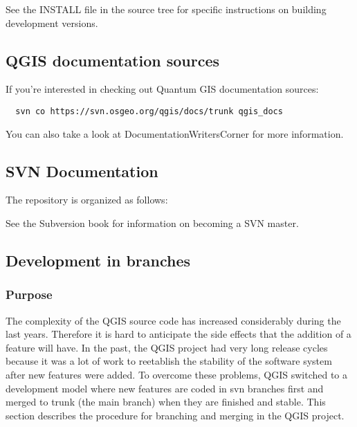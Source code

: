 See the INSTALL file in the source tree for specific instructions on building
development versions. 

\hypertarget{toc32}{}
\subsection{QGIS documentation sources}
If you're interested in checking out Quantum GIS documentation sources:

\begin{verbatim}
  svn co https://svn.osgeo.org/qgis/docs/trunk qgis_docs
\end{verbatim}

You can also take a look at DocumentationWritersCorner for more information.

\hypertarget{toc33}{}
\subsection{SVN Documentation}
The repository is organized as follows:


See the Subversion book 
for information on becoming a SVN master.

\hypertarget{toc34}{}
\subsection{Development in branches}
\hypertarget{toc35}{}
\subsubsection{Purpose}
The complexity of the QGIS source code has increased considerably during the
last years. Therefore it is hard to anticipate the side effects that the
addition of a feature will have. In the past, the QGIS project had very long
release cycles because it was a lot of work to reetablish the stability of the
software system after new features were added. To overcome these problems, QGIS
switched to a development model where new features are coded in svn branches
first and merged to trunk (the main branch) when they are finished and stable.
This section describes the procedure for branching and merging in the QGIS
project.

\hypertarget{toc36}{}
